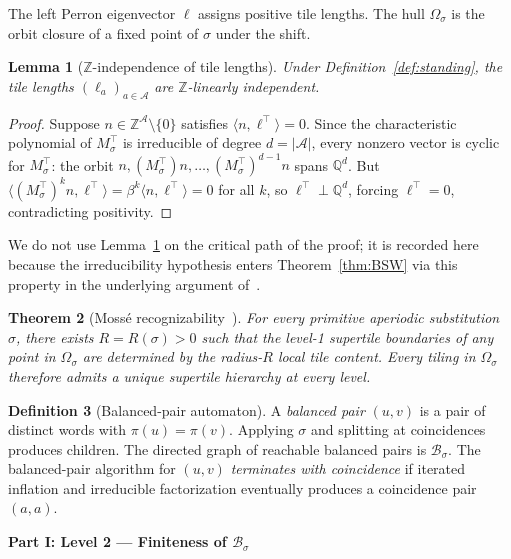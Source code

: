 \documentclass[11pt]{article}
\theoremstyle{plain}
\newtheorem{theorem}{Theorem}[section]
\newtheorem{lemma}[theorem]{Lemma}
\theoremstyle{definition}
\newtheorem{definition}[theorem]{Definition}
\theoremstyle{remark}
\newcommand{\Z}{\mathbb{Z}}
\newcommand{\Q}{\mathbb{Q}}
\newcommand{\A}{\mathcal{A}}
\newcommand{\B}{\mathcal{B}}
\begin{document}
The left Perron eigenvector $\ell$ assigns positive tile lengths. The hull $\Omega_\sigma$ is the orbit closure of a fixed point of $\sigma$ under the shift.

\begin{lemma}[$\Z$-independence of tile lengths]\label{lem:Z-indep}
Under Definition~\ref{def:standing}, the tile lengths $(\ell_a)_{a\in\A}$ are $\Z$-linearly independent.
\end{lemma}

\begin{proof}
Suppose $n\in\Z^\A\setminus\{0\}$ satisfies $\langle n,\ell^\top\rangle=0$. Since the characteristic polynomial of $M_\sigma^\top$ is irreducible of degree $d=|\A|$, every nonzero vector is cyclic for $M_\sigma^\top$: the orbit $n,(M_\sigma^\top)n,\dots,(M_\sigma^\top)^{d-1}n$ spans $\Q^d$. But $\langle (M_\sigma^\top)^k n,\ell^\top\rangle=\beta^k\langle n,\ell^\top\rangle=0$ for all $k$, so $\ell^\top\perp\Q^d$, forcing $\ell^\top=0$, contradicting positivity.
\end{proof}

We do not use Lemma~\ref{lem:Z-indep} on the critical path of the proof; it is recorded here because the irreducibility hypothesis enters Theorem~\ref{thm:BSW} via this property in the underlying argument of~\cite{BSW}.

\begin{theorem}[Moss\'e recognizability~\cite{Mosse1,Mosse2}]\label{thm:Mosse}
For every primitive aperiodic substitution $\sigma$, there exists $R=R(\sigma)>0$ such that the level-1 supertile boundaries of any point in $\Omega_\sigma$ are determined by the radius-$R$ local tile content. Every tiling in $\Omega_\sigma$ therefore admits a unique supertile hierarchy at every level.
\end{theorem}

\begin{definition}[Balanced-pair automaton]\label{def:BPA}
A \emph{balanced pair} $(u,v)$ is a pair of distinct words with $\pi(u)=\pi(v)$. Applying $\sigma$ and splitting at coincidences produces children. The directed graph of reachable balanced pairs is $\B_\sigma$. The balanced-pair algorithm for $(u,v)$ \emph{terminates with coincidence} if iterated inflation and irreducible factorization eventually produces a coincidence pair $(a,a)$.
\end{definition}

\begin{center}\textbf{Part I: Level 2 --- Finiteness of $\B_\sigma$}\end{center}
\end{document}
